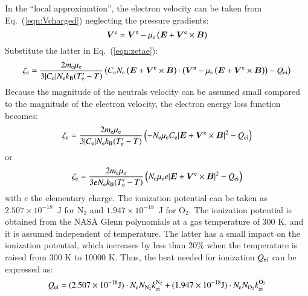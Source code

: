 \documentclass{warpdoc}
\newcommand{\mfd}{\displaystyle}
\renewcommand{\vec}[1]{\bm{#1}}
\let\citen\cite
\begin{document}
%
In the ``local approximation'',  the electron velocity can be taken from Eq.\ (\ref{eqn:Vcharged}) neglecting the pressure gradients:
%
\begin{equation}
  \vec{V}^{\rm e}=\vec{V}^{\rm n} - \mu_{\rm e} \left(\vec{E}+\vec{V}^{\rm e} \times \vec{B}\right)
\label{eqn:zetae_Ve}
\end{equation}
% 
Substitute the latter in Eq.\ (\ref{eqn:zetae}):
%
\begin{equation}
  \zeta_{\rm e}  
=  
 \frac{2 m_{\rm e} \mu_{\rm e}}{3 |C_{\rm e}| N_{\rm e} k_{\rm B} (T_{\rm e}^\prime-T) }
\left( C_{\rm e} N_{\rm e} \left(\vec{E} + \vec{V^{\rm e}} \times \vec{B}\right)\cdot \left(\vec{V}^{\rm n} - \mu_{\rm e} \left(\vec{E}+\vec{V}^{\rm e} \times \vec{B}\right)\right)
 - Q_{\rm ei}\right)
 \end{equation}
%
Because the magnitude of the neutrals velocity can be assumed small compared to the magnitude of the electron velocity, the electron energy loss function becomes:
%
\begin{equation}
  \zeta_{\rm e}  
=  
 \frac{2 m_{\rm e} \mu_{\rm e}}{3 |C_{\rm e}| N_{\rm e} k_{\rm B} (T_{\rm e}^\prime-T) }
\left(  -N_{\rm e} \mu_{\rm e} C_{\rm e} |\vec{E}+\vec{V}^{\rm e}\times \vec{B}|^2
 - Q_{\rm ei}\right)
 \end{equation}
%
or
%
\begin{equation}
  \zeta_{\rm e}  
=  
 \frac{2 m_{\rm e} \mu_{\rm e}}{3 e N_{\rm e} k_{\rm B} (T_{\rm e}^\prime-T) }
\left(  N_{\rm e} \mu_{\rm e} e |\vec{E}+\vec{V}^{\rm e}\times \vec{B}|^2
 - Q_{\rm ei}\right)
 \end{equation}
%
with $e$ the elementary charge. The ionization potential  can be taken as $2.507 \times 10^{-18}$~J for N$_2$ and $1.947 \times 10^{-18}$~J for O$_2$. The ionization potential is obtained from the NASA Glenn polynomials \citen{nasa:2002:mcbride} at a gas temperature of 300 K, and it is assumed independent of temperature. The latter has a small impact on the ionization potential, which increases by less than 20\% when the temperature is raised from 300 K to 10000 K. Thus, the heat needed for ionization $Q_{\rm ei}$ can be expressed as:
%
\begin{equation} 
 \begin{array}{r}\mfd
 Q_{\rm ei}= (2.507 \times 10^{-18} {\rm J}) \cdot N_{\rm e} N_{\rm N_2} k_{\rm ei}^{\rm N_2}
           + (1.947 \times 10^{-18} {\rm J}) \cdot  N_{\rm e} N_{\rm O_2} k_{\rm ei}^{\rm O_2}
 \end{array}
\end{equation}
\end{document}

